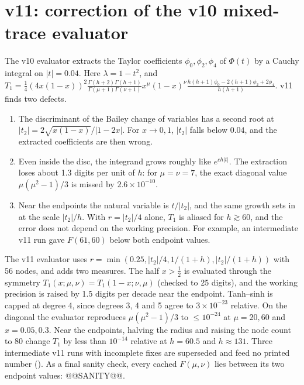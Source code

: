 \section{v11: correction of the v10 mixed-trace evaluator}
\label{sec:v11bug}

The v10 evaluator  extracts the Taylor
coefficients \(\phi_0,\phi_2,\phi_4\) of \(\Phi(t)\) by a Cauchy
integral on \(|t|=0.04\). Here \(\lambda=1-t^2\), and
\(T_1=\tfrac14(4x(1-x))^2\frac{\Gamma(h+2)\Gamma(h+1)}{\Gamma(\mu+1)\Gamma(\nu+1)}x^\mu(1-x)^\nu
\frac{h(h+1)\phi_0-2(h+1)\phi_2+2\phi_4}{h(h+1)}\). v11 finds two
defects.
\begin{enumerate}[label=(\roman*)]
\item The discriminant of the Bailey change of variables has a second
root at \(|t_2|=2\sqrt{x(1-x)}/|1-2x|\). For \(x\to0,1\), \(|t_2|\)
falls below \(0.04\), and the extracted coefficients are then wrong.
\item Even inside the disc, the integrand grows roughly like
\(e^{c h|t|}\). The extraction loses about 1.3 digits per unit of
\(h\): for \(\mu=\nu=7\), the exact diagonal value
\(\mu(\mu^2-1)/3\) is missed by \(2.6\times10^{-10}\).
\item Near the endpoints the natural variable is \(t/|t_2|\), and the
same growth sets in at the scale \(|t_2|/h\). With
\(r=|t_2|/4\) alone, \(T_1\) is aliased for \(h\gtrsim60\), and the
error does not depend on the working precision. For example, an
intermediate v11 run gave \(F(61,60)\) below both endpoint values.
\end{enumerate}
The v11 evaluator  uses
\(r=\min(0.25,|t_2|/4,1/(1+h),|t_2|/(1+h))\) with 56 nodes, and
 adds two measures. The half \(x>\tfrac12\)
is evaluated through the symmetry
\(T_1(x;\mu,\nu)=T_1(1-x;\nu,\mu)\) (checked to 25 digits), and the
working precision is raised by 1.5 digits per decade near the
endpoint. Tanh--sinh is capped at degree 4, since degrees 3, 4 and 5
agree to \(3\times10^{-23}\) relative. On the diagonal the evaluator
reproduces \(\mu(\mu^2-1)/3\) to \(\le10^{-24}\) at \(\mu=20,60\)
and \(x=0.05,0.3\). Near the endpoints, halving the radius and
raising the node count to 80 change \(T_1\) by less than
\(10^{-14}\) relative at \(h=60.5\) and \(h\approx131\). Three
intermediate v11 runs with incomplete fixes are superseded and feed
no printed number (). As a
final sanity check, every cached \(F(\mu,\nu)\) lies between its two
endpoint values: @@SANITY@@.

